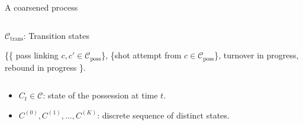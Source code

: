 \documentclass[10pt]{beamer}
\newcommand{\Cset}{\mathcal{C}}
\newcommand{\Ctrans}{\mathcal{C}_{\text{trans}}}
\newcommand{\Cposs}{\mathcal{C}_{\text{poss}}}
\begin{document}
\begin{frame}{A coarsened process}
\begin{columns}[T]
\begin{column}{.4\textwidth}
\begin{minipage}{\textwidth}
\pause
\begin{block}{$\Ctrans$: Transition states}
\begin{center} \{\{ pass linking $c, c' \in \Cposs$\}, \{shot attempt from $c \in \Cposs$\}, turnover in progress, \\ rebound in progress \}.
\end{center}
\end{block}
\end{minipage}
\end{column}%
\end{columns}
\pause
\begin{itemize}
\item $C_t \in \Cset$: state of the possession at time $t$.
\item $C^{(0)}, C^{(1)}, \ldots, C^{(K)}$: discrete sequence of distinct states.
\end{itemize}
\end{frame}
\end{document}
